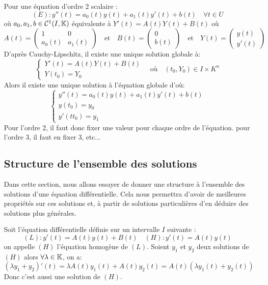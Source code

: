 \begin{remark} 
	Pour une équation d'ordre 2 scalaire :
		\[ (E) : y''(t) = a_0(t)y(t) + a_1(t)y'(t) + b(t) \quad \forall t \in U \] 
	où $a_0, a_1,b \in \mathcal{C}^1(I, \mathbb{K})$ équivalente à $ Y'(t) = A(t) Y(t) + B(t) $ où 
		\[ A(t) =  
			\begin{pmatrix}
				1 & 0 \\ 
				a_0(t) & a_1(t) 
			\end{pmatrix} 
			\quad \text{et} \quad B(t) = 
			\begin{pmatrix}
				0 \\ 
				b(t) 
			\end{pmatrix}
			\quad \text{et} \quad Y(t) = 
			\begin{pmatrix} 
				y(t)  \\
				y'(t) 
			\end{pmatrix} \]
	D'après Cauchy-Lipschitz, il existe une unique solution globale à: 
		\[ 
			\begin{cases} 
				Y'(t) = A(t) Y(t) + B(t) \\ 
				Y(t_0) = Y_0
			\end{cases} 
			\quad \text{où} \quad (t_0, Y_0) \in I \times K^n 
		\]
	Alors il existe une unique solution à l'équation globale d'où: 
		\[ \begin{cases} 
				y''(t) = a_0(t) y(t) + a_1(t) y'(t) + b(t) \\ 
				y(t_0) = y_0 \\ 
				y'(tt_0) = y_1 
			\end{cases} \] 
	Pour l'ordre 2, il faut donc fixer une valeur pour chaque ordre de l'équation. 
	pour l'ordre 3, il faut en fixer 3, etc...
\end{remark}

\subsection{Structure de l'ensemble des solutions}

Dans cette section, nous allons essayer de donner une structure à 
l'ensemble des solutions d'une équation différentielle. Cela nous 
permettra d'avoir de meilleures propriétés sur ces solutions et, à partir 
de solutions particulières d'en déduire des solutions plus générales. 

\vspace{0.3cm} 

Soit l'équation différentielle définie sur un intervalle $I$ suivante :
	\[ (L) : y'(t) = A(t) y(t) + B(t) \quad (H) : y'(t) = A(t)y(t) \] 
on appelle $(H)$ l'équation homogène de $(L)$. 
Soient $y_1$ et $y_2$ deux solutions de $(H)$ alors $ \forall \lambda \in \mathbb{K}$, on a: 
	\[ (\lambda y_1 + y_2)'(t) = \lambda A(t)y_1(t) + A(t) y_2(t) = A(t) (\lambda y_1(t) + y_2(t)) \]
Donc c'est aussi une solution de $(H)$. 

